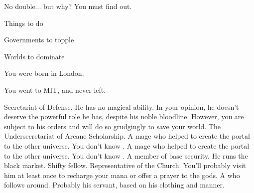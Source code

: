 \documentclass[char]{guildcamp3}
\begin{document}
No double... but why? You must find out.

\begin{itemz}[Goals]
  \item Things to do
  \item Governments to topple
  \item Worlds to dominate
\end{itemz}

\begin{itemz}[Notes]
  \item You were born in London.
  \item You went to MIT, and never left.
\end{itemz}


\begin{contacts}
  \contact{\cNobleOne{}} Secretariat of Defense. He has no magical ability. In your opinion, he doesn't deserve the powerful role he has, despite his noble bloodline. However, you are subject to his orders and will do so grudgingly to save your world.
  \contact{\cNobleTwo{}} The Undersecretariat of Arcane Scholarship. 
  \contact{\cMageOne{}} A mage who helped to create the portal to the other universe. You don't know \cMageOne{\them}.
  \contact{\cMageTwo{}} A mage who helped to create the portal to the other universe. You don't know \cMageTwo{\them}.
  \contact{\cRogueTwo{}} A member of base security. He runs the black market. Shifty fellow.
  \contact{\cPaladin} Representative of the Church. You'll probably visit him at least once to recharge your mana or offer a prayer to the gods.
  \contact{\cServant{}} A \cServant{\gender} who follows \cNobleOne{} around. Probably his servant, based on his clothing and manner. 
\end{contacts}
\end{document}
